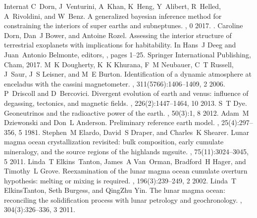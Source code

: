 \documentclass[letterpaper,10pt,english]{jupyterBook}
\begin{document}
\begin{sphinxthebibliography}{Internat}
\sphinxAtStartPar
C Dorn, J Venturini, A Khan, K Heng, Y Alibert, R Helled, A Rivoldini, and W Benz. A generalized bayesian inference method for constraining the interiors of super earths and sub\sphinxhyphen{}neptunes. , 0 2017. .
\sphinxAtStartPar
Caroline Dorn, Dan J Bower, and Antoine Rozel. Assessing the interior structure of terrestrial exoplanets with implications for habitability. In Hans J Deeg and Juan Antonio Belmonte, editors, , pages 1–25. Springer International Publishing, Cham, 2017.
\sphinxAtStartPar
M K Dougherty, K K Khurana, F M Neubauer, C T Russell, J Saur, J S Leisner, and M E Burton. Identification of a dynamic atmosphere at enceladus with the cassini magnetometer. , 311(5766):1406–1409, 2 2006.
\sphinxAtStartPar
P Driscoll and D Bercovici. Divergent evolution of earth and venus: influence of degassing, tectonics, and magnetic fields. , 226(2):1447–1464, 10 2013.
\sphinxAtStartPar
S T Dye. Geoneutrinos and the radioactive power of the earth. , 50(3):1, 8 2012.
\sphinxAtStartPar
Adam M Dziewonski and Don L Anderson. Preliminary reference earth model. , 25(4):297–356, 5 1981.
\sphinxAtStartPar
Stephen M Elardo, David S Draper, and Charles K Shearer. Lunar magma ocean crystallization revisited: bulk composition, early cumulate mineralogy, and the source regions of the highlands mg\sphinxhyphen{}suite. , 75(11):3024–3045, 5 2011.
\sphinxAtStartPar
Linda T Elkins Tanton, James A Van Orman, Bradford H Hager, and Timothy L Grove. Re\sphinxhyphen{}examination of the lunar magma ocean cumulate overturn hypothesis: melting or mixing is required. , 196(3):239–249, 2 2002.
\sphinxAtStartPar
Linda T Elkins\sphinxhyphen{}Tanton, Seth Burgess, and Qing\sphinxhyphen{}Zhu Yin. The lunar magma ocean: reconciling the solidification process with lunar petrology and geochronology. , 304(3):326–336, 3 2011.
\sphinxAtStartPar

\end{sphinxthebibliography}
\end{document}
